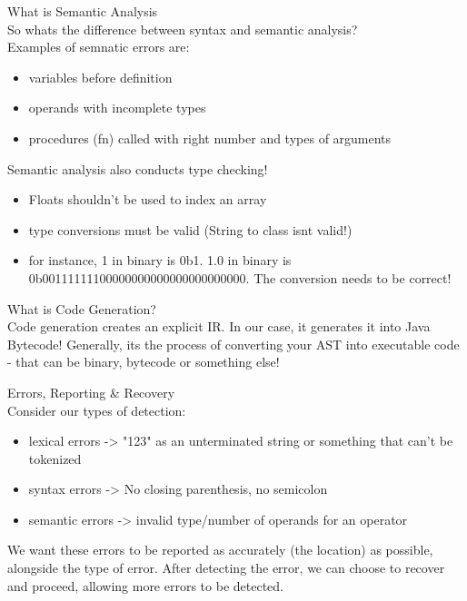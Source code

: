 \documentclass[journal, letterpaper]{IEEEtran}
\begin{document}
\begin{theory}{What is Semantic Analysis}\\
    So whats the difference between syntax and semantic analysis?\\

    Examples of semnatic errors are:
    \begin{itemize}
        \item variables before definition 
        \item operands with incomplete types
        \item procedures (fn) called with right number and types of arguments
    \end{itemize}

    Semantic analysis also conducts type checking! 
    \begin{itemize}
        \item Floats shouldn't be used to index an array
        \item type conversions must be valid (String to class isnt valid!)
        \item for instance, 1 in binary is 0b1. 1.0 in binary is
            0b00111111100000000000000000000000. The conversion needs to be correct!
    \end{itemize}
\end{theory}

\begin{theory}{What is Code Generation?}\\
    Code generation creates an explicit IR. In our case, it generates it into Java
    Bytecode! Generally, its the process of converting your AST into executable code -
    that can be binary, bytecode or something else!
\end{theory}

\begin{aside}{Errors, Reporting \& Recovery}\\
    Consider our types of detection:
    \begin{itemize}
        \item lexical errors -> "123" as an unterminated string or something that can't be
        tokenized
        \item syntax errors -> No closing parenthesis, no semicolon
        \item semantic errors -> invalid type/number of operands for an operator
    \end{itemize}

    We want these errors to be reported as accurately (the location) as possible,
    alongside the type of error. After detecting the error, we can choose to recover and
    proceed, allowing more errors to be detected.
\end{aside}
\end{document}
